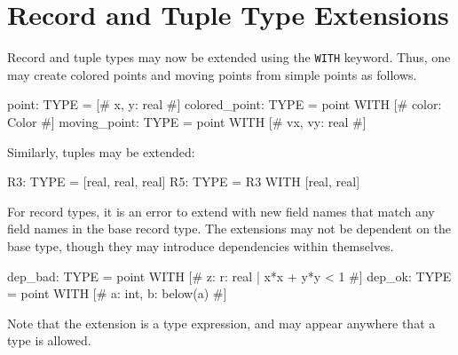 
\section{Record and Tuple Type Extensions}\label{type-extensions}

Record and tuple types may now be extended using the \texttt{WITH}
keyword. Thus, one may create colored points and moving points from
simple points as follows.
\begin{pvsex}
  point: TYPE = [# x, y: real #]
  colored_point: TYPE = point WITH [# color: Color #]
  moving_point: TYPE = point WITH [# vx, vy: real #]
\end{pvsex}
Similarly, tuples may be extended:
\begin{pvsex}
  R3: TYPE = [real, real, real]
  R5: TYPE = R3 WITH [real, real]
\end{pvsex}
For record types, it is an error to extend with new field names that
match any field names in the base record type.  The extensions may not
be dependent on the base type, though they may introduce dependencies
within themselves.
\begin{pvsex}
  dep_bad: TYPE = point WITH [# z: {r: real | x*x + y*y < 1} #]
  dep_ok: TYPE = point WITH [# a: int, b: below(a) #]
\end{pvsex}
Note that the extension is a type expression, and may appear anywhere
that a type is allowed.


